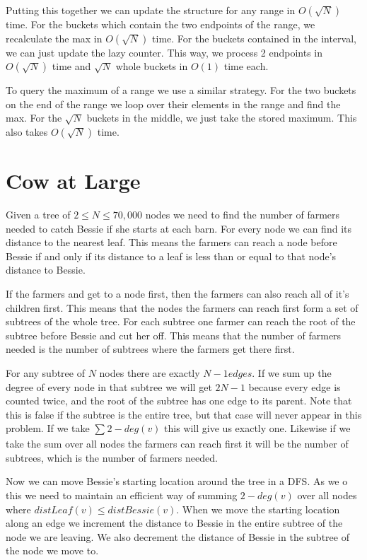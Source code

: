 \documentclass[11pt]{article}
\begin{document}
Putting this together we can update the structure for any range in $O(\sqrt{N})$ time.  For the buckets which contain the two endpoints of the range, we recalculate the max in $O(\sqrt{N})$ time.  For the buckets contained in the interval, we can just update the lazy counter.  This way, we process 2 endpoints in $O(\sqrt{N})$ time and $\sqrt{N}$ whole buckets in $O(1)$ time each.

To query the maximum of a range we use a similar strategy.  For the two buckets on the end of the range we loop over their elements in the range and find the max.  For the $\sqrt{N}$ buckets in the middle, we just take the stored maximum.  This also takes $O(\sqrt{N})$ time.

\section{Cow at Large}

Given a tree of $2\leq N\leq 70,000$ nodes we need to find the number of farmers needed to catch Bessie if she starts at each barn.  For every node we can find its distance to the nearest leaf.  This means the farmers can reach a node before Bessie if and only if its distance to a leaf is less than or equal to that node's distance to Bessie.

If the farmers and get to a node first, then the farmers can also reach all of it's children first.  This means that the nodes the farmers can reach first form a set of subtrees of the whole tree.  For each subtree one farmer can reach the root of the subtree before Bessie and cut her off.  This means that the number of farmers needed is the number of subtrees where the farmers get there first.

For any subtree of $N$ nodes there are exactly $N-1 edges$.  If we sum up the degree of every node in that subtree we will get $2N-1$ because every edge is counted twice, and the root of the subtree has one edge to its parent.  Note that this is false if the subtree is the entire tree, but that case will never appear in this problem.  If we take $\sum_{}{}{2-deg(v)}$ this will give us exactly one.  Likewise if we take the sum over all nodes the farmers can reach first it will be the number of subtrees, which is the number of farmers needed.

Now we can move Bessie's starting location around the tree in a DFS.  As we o this we need to maintain an efficient way of summing $2-deg(v)$ over all nodes where $distLeaf(v)\leq distBessie(v)$. When we move the starting location along an edge we increment the distance to Bessie in the entire subtree of the node we are leaving.  We also decrement the distance of Bessie in the subtree of the node we move to.
\end{document}

